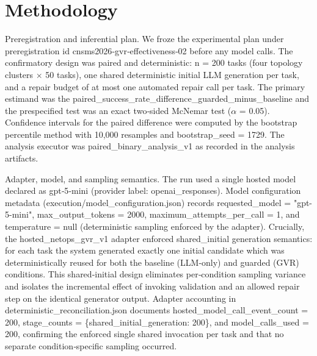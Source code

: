 \documentclass[conference]{IEEEtran}
\begin{document}
\section{Methodology}
Preregistration and inferential plan. We froze the experimental plan under preregistration id cnsms2026‑gvr‑effectiveness‑02 before any model calls. The confirmatory design was paired and deterministic: n = 200 tasks (four topology clusters \ensuremath{\times} 50 tasks), one shared deterministic initial LLM generation per task, and a repair budget of at most one automated repair call per task. The primary estimand was the paired\_success\_rate\_difference\_guarded\_minus\_baseline and the prespecified test was an exact two‑sided McNemar test (\ensuremath{\alpha} = 0.05). Confidence intervals for the paired difference were computed by the bootstrap percentile method with 10,000 resamples and bootstrap\_seed = 1729. The analysis executor was paired\_binary\_analysis\_v1 as recorded in the analysis artifacts.

Adapter, model, and sampling semantics. The run used a single hosted model declared as gpt‑5‑mini (provider label: openai\_responses). Model configuration metadata (execution/model\_configuration.json) records requested\_model = "gpt-5-mini", max\_output\_tokens = 2000, maximum\_attempts\_per\_call = 1, and temperature = null (deterministic sampling enforced by the adapter). Crucially, the hosted\_netops\_gvr\_v1 adapter enforced shared\_initial generation semantics: for each task the system generated exactly one initial candidate which was deterministically reused for both the baseline (LLM‑only) and guarded (GVR) conditions. This shared‑initial design eliminates per‑condition sampling variance and isolates the incremental effect of invoking validation and an allowed repair step on the identical generator output. Adapter accounting in deterministic\_reconciliation.json documents hosted\_model\_call\_event\_count = 200, stage\_counts = \{shared\_initial\_generation: 200\}, and model\_calls\_used = 200, confirming the enforced single shared invocation per task and that no separate condition‑specific sampling occurred.
\end{document}
